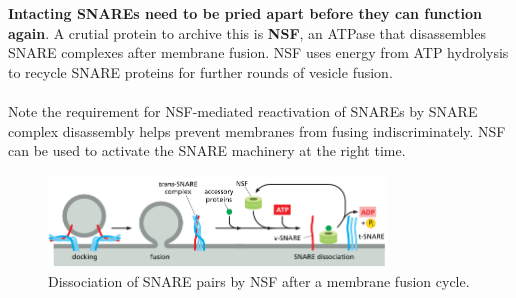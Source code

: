 \documentclass[../main.tex]{subfiles}
\begin{document}
\begin{figure}[H]
	\centering
	\caption{}
\end{figure}

\textbf{Intacting SNAREs need to be pried apart before they can function again}. A crutial protein to archive this is \textbf{\gls{NSF}}, an ATPase that disassembles SNARE complexes after membrane fusion. NSF uses energy from ATP hydrolysis to recycle SNARE proteins for further rounds of vesicle fusion.\\
\\  
Note the requirement for NSF-mediated reactivation of SNAREs by SNARE complex disassembly helps prevent membranes from fusing indiscriminately. NSF can be used to activate the SNARE machinery at the right time.   
\begin{figure}[H]
	\centering
	\includegraphics[width=0.8\textwidth]{14}
	\caption{Dissociation of SNARE pairs by NSF after a membrane fusion cycle.}
\end{figure}
	
\end{document}
